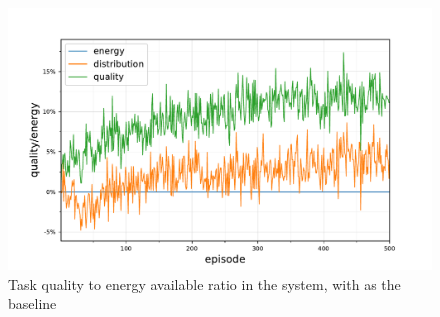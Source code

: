 \begin{figure}
	\centering
	\includegraphics[width=0.7\linewidth]{5.19_ctv-quality-energy-baseline-comparison}
	\caption{Task quality to energy available ratio in the \simulationExtended{}{} system, with \algorithmEnergy{}{} as the baseline}
	\label{fig:ctv-quality-energy-baseline-comparison}
\end{figure}

